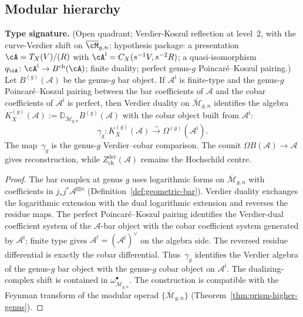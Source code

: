
\subsection{Modular hierarchy}\label{subsec:modular-hierarchy}

\begin{theorem}\label{thm:poincare-extended}
\textbf{Type signature.} (Open quadrant; Verdier-Koszul reflection at
level~$2$, with the curve-Verdier shift on $\overline{\cM}_{g,n}$;
hypothesis package: a presentation
$\cA=T_X(V)/(R)$ with
$\cA^{\mathrm i}=C_X(s^{-1}V,s^{-2}R)$; a quasi-isomorphism
$q_\cA\colon\cA^{\mathrm i}\to B^{\mathrm{ch}}(\cA)$; finite
duality; perfect genus-$g$ Poincar\'e--Koszul pairing.)
Let $B^{(g)}(\mathcal{A})$ be the genus-$g$ bar object. If
$\mathcal{A}^{\mathrm i}$ is finite-type and the
genus-$g$ Poincar\'e--Koszul pairing between the bar coefficients of
$\mathcal A$ and the cobar coefficients of $\mathcal A^{\mathrm i}$ is perfect,
then Verdier duality on $\overline{\mathcal{M}}_{g,n}$ identifies the
algebra
$K_X^{(g)}(\mathcal A):=
\mathbb D_{\overline{\mathcal M}_{g,n}}B^{(g)}(\mathcal A)$ with the
cobar object built from $\mathcal{A}^{\mathrm i}$:
\[
\gamma_g\colon K_X^{(g)}(\mathcal A)
\xrightarrow{\sim}\Omega^{(g)}(\mathcal{A}^{\mathrm i}).
\]
The map~$\gamma_g$ is the genus-$g$ Verdier--cobar comparison.  The
counit $\Omega B(\mathcal A)\to\mathcal A$ gives reconstruction, while
$Z^{\mathrm{der}}_{\mathrm{ch}}(\mathcal A)$ remains the Hochschild
centre.
\end{theorem}

\begin{proof}
The bar complex at genus $g$ uses logarithmic forms on
$\overline{\mathcal{M}}_{g,n}$ with coefficients in
$j_*j^*\mathcal{A}^{\boxtimes n}$
(Definition~\ref{def:geometric-bar}). Verdier duality exchanges the
logarithmic extension with the dual logarithmic extension and reverses
the residue maps. The perfect Poincar\'e--Koszul pairing identifies
the Verdier-dual coefficient system of the $\mathcal A$-bar object
with the cobar coefficient system generated by
$\mathcal A^{\mathrm i}$; finite type gives
$\mathcal A^!=(\mathcal A^{\mathrm i})^\vee$ on the algebra side.
The reversed residue differential is exactly the cobar differential.
Thus~$\gamma_g$ identifies the Verdier algebra of the genus-$g$ bar
object with the genus-$g$ cobar object on $\mathcal{A}^{\mathrm i}$.
The dualizing-complex shift is
contained in $\omega^\bullet_{\overline{\mathcal{M}}_{g,n}}$. The
construction is compatible with the Feynman transform of the modular
operad
$\{\overline{\mathcal{M}}_{g,n}\}$
(Theorem~\ref{thm:prism-higher-genus}).
\end{proof}

